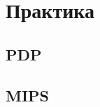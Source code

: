 \documentclass[a5paper,12pt,oneside,ukrainian]{book}
\begin{document}
\tableofcontents
\chapter{Практика}
\section{PDP}


\section{MIPS}


\end{document}
